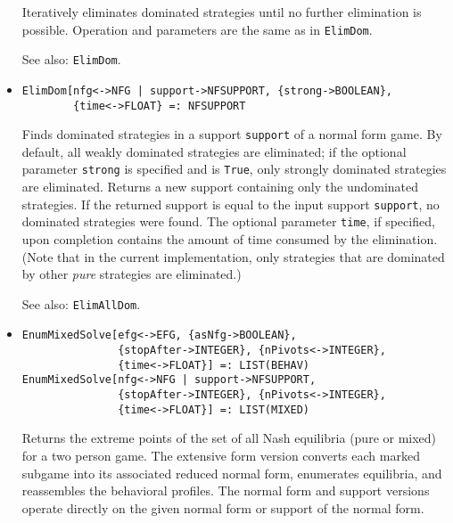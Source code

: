 \begin{itemize}
\bd Iteratively eliminates dominated strategies until no further
elimination is possible.  Operation and parameters are the same as in
{\tt ElimDom}.
\item
[See also:] {\tt ElimDom}.  
\ed

\item
\protect \large \begin{verbatim}
ElimDom[nfg<->NFG | support->NFSUPPORT, {strong->BOOLEAN}, 
        {time<->FLOAT} =: NFSUPPORT
\end{verbatim} \normalsize

\bd
Finds dominated strategies in a support \verb+support+ of a normal
form game.  By default, all weakly dominated strategies are eliminated;
if the optional parameter \verb+strong+ is specified and is \verb+True+,
only strongly dominated strategies are eliminated.  Returns a new support
containing only the undominated strategies.  If the returned support
is equal to the input support \verb+support+, no dominated strategies were
found.  The optional parameter \verb+time+, if specified, upon completion
contains the amount of time consumed by the elimination.  (Note that in
the current implementation, only strategies that are dominated by
other {\em pure} strategies are eliminated.)  
\item
[See also:] {\tt ElimAllDom}.  
\ed

\item
\protect \large \begin{verbatim}
EnumMixedSolve[efg<->EFG, {asNfg->BOOLEAN}, 
               {stopAfter->INTEGER}, {nPivots<->INTEGER}, 
               {time<->FLOAT}] =: LIST(BEHAV)
EnumMixedSolve[nfg<->NFG | support->NFSUPPORT, 
               {stopAfter->INTEGER}, {nPivots<->INTEGER}, 
               {time<->FLOAT}] =: LIST(MIXED)
\end{verbatim}\normalsize

\bd
Returns the extreme points of the set of all Nash equilibria (pure or
mixed) for a two person game.  The extensive form version converts
each marked subgame into its associated reduced normal form, enumerates
equilibria, and reassembles the behavioral profiles.  The normal form
and support versions operate directly on the given normal form or support
of the normal form.


\end{itemize}
